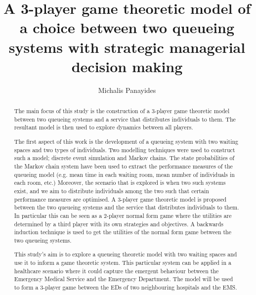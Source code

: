 \documentclass{article}
\title{A 3-player game theoretic model of a choice between two queueing systems with strategic managerial decision making}
\author{Michalis Panayides}
\begin{document}
\maketitle
\begin{abstract}

    The main focus of this study is the construction of a 3-player game 
    theoretic model between two queueing systems and a service that distributes 
    individuals to them. 
    The resultant model is then used to explore dynamics between all players.

    The first aspect of this work is the development of a queueing system
    with two waiting spaces and two types of individuals. 
    Two modelling techniques were used to construct such a model; discrete event 
    simulation and Markov chains. 
    The state probabilities of the Markov chain system have been used to extract
    the performance measures of the queueing model (e.g. mean time in each 
    waiting room, mean number of individuals in each room, etc.)
    Moreover, the scenario that is explored is when two such systems
    exist, and we aim to distribute individuals among the two such that certain
    performance measures are optimised. 
    A 3-player game theoretic model is proposed between the two
    queueing systems and the service that distributes individuals to them. 
    In particular this can be seen as a 2-player normal form game where the 
    utilities are determined by a third player with its own strategies and 
    objectives. 
    A backwards induction technique is used to get the utilities of the normal 
    form game between the two queueing systems.

    This study's aim is to explore a queueing theoretic model with 
    two waiting spaces and use it to inform a game theoretic system. This 
    particular system can be applied in a healthcare scenario where it could
    capture the emergent behaviour between the Emergency Medical Service and the
    Emergency Department. The model will be used to form a 3-player game between
    the EDs of two neighbouring hospitals and the EMS.
    
\end{abstract}
    
\end{document}
